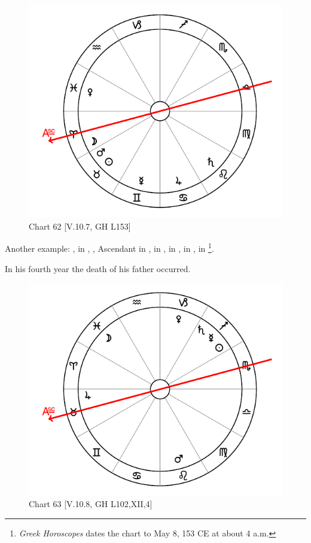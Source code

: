 \begin{figure}
\centering
\vspace{-20pt}
\includegraphics[width=.68\textwidth]{charts/5_10_07}
\caption{Chart 62 [V.10.7, GH L153]}
\label{fig:chart62}
\end{figure}

\noindent Another example: \Sun, \Mars\xspace in \Taurus, \Moon, Ascendant in \Aries, \Saturn\xspace in \Leo, \Jupiter\xspace in \Cancer, \Venus\xspace in \Pisces, \Mercury\xspace in \Gemini\footnote{\textit{Greek Horoscopes} dates the chart to May 8, 153 CE at about 4 a.m.}. 

In his fourth year the death of his father occurred.

\vspace{1.2cm}

\begin{figure}
\centering
\vspace{-20pt}
\includegraphics[width=.68\textwidth]{charts/5_10_08}
\caption{Chart 63 [V.10.8, GH L102,XII,4]}
\label{fig:chart63}
\end{figure}

